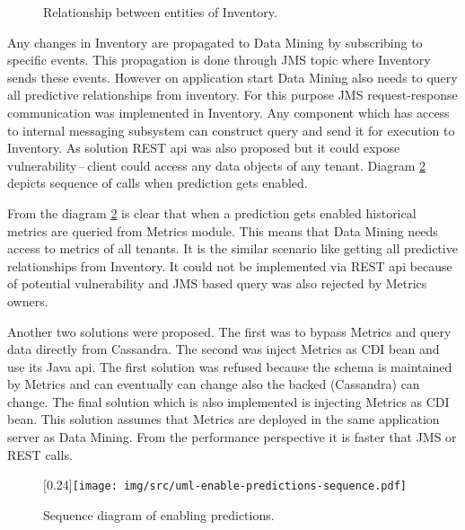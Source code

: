     \begin{figure}[H]
        \begin{center}
            \caption{Relationship between entities of Inventory.}
            \label{img:relationship}
        \end{center}
    \end{figure}

    Any changes in Inventory are propagated to Data Mining by subscribing to specific events. This propagation is done
    through JMS topic where Inventory sends these events. However on application start Data Mining also needs to query
    all predictive relationships from inventory. For this purpose JMS request-response communication was implemented in
    Inventory. Any component which has access to internal messaging subsystem can construct query and send it for
    execution to Inventory. As solution REST api was also proposed but it could expose vulnerability\,--\,client
    could access any data objects of any tenant. Diagram \ref{img:sequence-enab-pred} depicts sequence of calls when
    prediction gets enabled.

    From the diagram \ref{img:sequence-enab-pred} is clear that when a prediction gets enabled historical metrics are
    queried from Metrics module. This means that Data Mining needs access to metrics of all tenants. It is the similar
    scenario like getting all predictive relationships from Inventory. It could not be implemented via REST api
    because of potential vulnerability and JMS based query was also rejected by Metrics owners.

    Another two solutions were proposed. The first was to bypass Metrics and query data directly from Cassandra.
    The second was inject Metrics as CDI bean and use its Java api. The first solution was refused because the schema
    is maintained by Metrics and can eventually can change also the backed (Cassandra) can change. The final
    solution which is also implemented is injecting Metrics as CDI bean. This solution assumes that Metrics
    are deployed in the same application server as Data Mining. From the performance perspective it is faster that
    JMS or REST calls.

    \begin{figure}[H]
        \begin{center}
            \scalebox{0.33}[0.24]{\texttt{[image: img/src/uml-enable-predictions-sequence.pdf]}}
            \caption{Sequence diagram of enabling predictions.}
            \label{img:sequence-enab-pred}
        \end{center}
    \end{figure}

